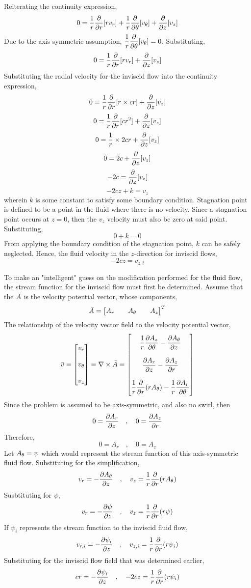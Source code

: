\documentclass[a4paper, 12pt]{report}
\begin{document}
\begin{center}
Reiterating the continuity expression,
$$0= \frac{1}{r}\frac{\partial}{\partial r}[r v_r] + \frac{1}{r} \frac{\partial}{\partial \theta}[v_\theta] + \frac{\partial}{\partial z}[v_z]$$
Due to the axis-symmetric assumption, $\displaystyle{\frac{1}{r} \frac{\partial}{\partial\theta}[v_\theta]=0}$. Substituting,
$$0= \frac{1}{r}\frac{\partial}{\partial r}[r v_r] + \frac{\partial}{\partial z}[v_z]$$
Substituting the radial velocity for the inviscid flow into the continuity expression,
$$0= \frac{1}{r}\frac{\partial}{\partial r}[r \times cr] + \frac{\partial}{\partial z}[v_z]$$
$$0= \frac{1}{r}\frac{\partial}{\partial r}[cr^2] + \frac{\partial}{\partial z}[v_z]$$
$$0= \frac{1}{r} \times 2cr + \frac{\partial}{\partial z}[v_z]$$
$$0=  2c + \frac{\partial}{\partial z}[v_z]$$
$$-2c = \frac{\partial}{\partial z}[v_z]$$
$$-2cz + k = v_z$$
wherein $k$ is some constant to satisfy some boundary condition. Stagnation point is defined to be a point in the fluid where there is no velocity. Since a stagnation point occurs at $z=0$, then the $v_z$ velocity must also be zero at said point. Substituting,
$$0 + k = 0$$
From applying the boundary condition of the stagnation point, $k$ can be safely neglected. Hence, the fluid velocity in the $z$-direction for inviscid flows,
$$-2cz = v_{z,i}$$

To make an "intelligent" guess on the modification performed for the fluid flow, the stream function for the inviscid flow must first be determined. Assume that the $\bar{A}$ is the velocity potential vector, whose components,
$$\bar{A} = \begin{bmatrix} A_r && A_\theta && A_z \end{bmatrix}^T$$
The relationship of the velocity vector field to the velocity potential vector,
$$\bar{v} = \begin{bmatrix} v_r \\~\\ v_\theta \\~\\ v_z \end{bmatrix} = \nabla\times\bar{A} = \begin{bmatrix}
\displaystyle{\frac{1}{r}\frac{\partial A_z}{\partial\theta} - \frac{\partial A_\theta}{\partial z}} \\~\\
\displaystyle{\frac{\partial A_r}{\partial z} - \frac{\partial A_z}{\partial r}} \\~\\
\displaystyle{\frac{1}{r}\frac{\partial}{\partial r}(rA_\theta) - \frac{1}{r}\frac{\partial A_r}{\partial\theta}}
\end{bmatrix}$$
Since the problem is assumed to be axis-symmetric, and also no swirl, then
$$0=\frac{\partial A_r}{\partial z} \quad,\quad 0=\frac{\partial A_z}{\partial r}$$
Therefore,
$$0= A_r \quad,\quad 0= A_z$$
Let $A_\theta = \psi$ which would represent the stream function of this axis-symmetric fluid flow. Substituting for the simplification,
$$v_r =  - \frac{\partial A_\theta}{\partial z} \quad,\quad v_z = \frac{1}{r}\frac{\partial}{\partial r}(rA_\theta)$$
Susbtituting for $\psi$,
$$v_r =  -\frac{\partial \psi}{\partial z} \quad,\quad v_z = \frac{1}{r}\frac{\partial}{\partial r}(r\psi)$$
If $\psi_i$ represents the stream function to the inviscid fluid flow,
$$v_{r,i} =  -\frac{\partial \psi_i}{\partial z} \quad,\quad v_{z,i} = \frac{1}{r}\frac{\partial}{\partial r}(r\psi_i)$$
Substituting for the inviscid flow field that was determined earlier,
$$cr =  -\frac{\partial \psi_i}{\partial z} \quad,\quad -2cz = \frac{1}{r}\frac{\partial}{\partial r}(r\psi_i)$$


\end{center}
\end{document}
